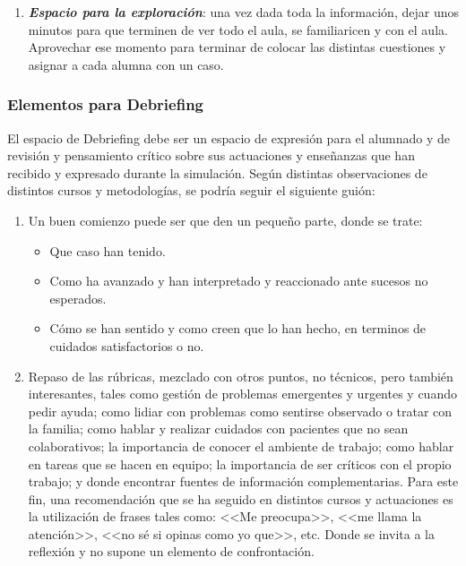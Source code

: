 \begin{enumerate}[topsep=0pt, partopsep=0pt,itemsep=0pt,parsep=0pt]
    \item \textbf{\textit{Espacio para la exploración}}: una vez dada toda la información, dejar unos minutos para que terminen de ver todo el aula, se familiaricen y con el aula. Aprovechar ese momento para terminar de colocar las distintas cuestiones y asignar a cada alumna con un caso.
\end{enumerate}
\subsubsection{Elementos para Debriefing}
El espacio de Debriefing debe ser un espacio de expresión para el alumnado y de revisión y pensamiento crítico sobre sus actuaciones y enseñanzas que han recibido y expresado durante la simulación. Según distintas observaciones de distintos cursos y metodologías, se podría seguir el siguiente guión:
\begin{enumerate}[topsep=0pt, partopsep=0pt,itemsep=0pt,parsep=0pt]
    \item Un buen comienzo puede ser que den un pequeño parte, donde se trate:
    \begin{itemize}[topsep=0pt, partopsep=0pt,itemsep=0pt,parsep=0pt]
        \item Que caso han tenido.
        \item Como ha avanzado y han interpretado y reaccionado ante sucesos no esperados.
        \item Cómo se han sentido y como creen que lo han hecho, en terminos de cuidados satisfactorios o no.
    \end{itemize}
    \item Repaso de las rúbricas, mezclado con otros puntos, no técnicos, pero también interesantes, tales como gestión de problemas emergentes y urgentes y cuando pedir ayuda; como lidiar con problemas como sentirse observado o tratar con la familia; como hablar y realizar cuidados con pacientes que no sean colaborativos; la importancia de conocer el ambiente de trabajo; como hablar en tareas que se hacen en equipo; la importancia de ser críticos con el propio trabajo; y donde encontrar fuentes de información complementarias.
        \subitem Para este fin, una recomendación que se ha seguido en distintos cursos y actuaciones es la utilización de frases tales como: <<Me preocupa>>, <<me llama la atención>>, <<no sé si opinas como yo que>>, etc. Donde se invita a la reflexión y no supone un elemento de confrontación.
\end{enumerate}




